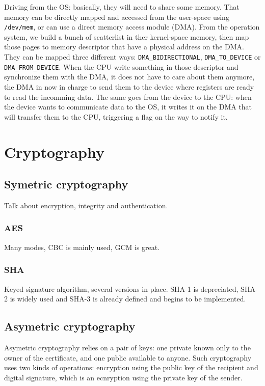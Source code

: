 Driving from the OS: basically, they will need to share some memory.
That memory can be directly mapped and accessed from the user-space using \texttt{/dev/mem}, or can use a direct memory access module (DMA).
From the operation system, we build a bunch of scatterlist in ther kernel-space memory, then map those pages to memory descriptor that have a physical address on the DMA.
They can be mapped three different ways: \texttt{DMA\_BIDIRECTIONAL}, \texttt{DMA\_TO\_DEVICE} or \texttt{DMA\_FROM\_DEVICE}.
When the CPU write something in those descriptor and synchronize them with the DMA, it does not have to care about them anymore, the DMA in now in charge to send them to the device where registers are ready to read the incomming data.
The same goes from the device to the CPU: when the device wants to communicate data to the OS, it writes it on the DMA that will transfer them to the CPU, triggering a flag on the way to notify it.

\section{Cryptography}

\subsection{Symetric cryptography}
Talk about encryption, integrity and authentication.


\subsubsection{AES}
Many modes, CBC is mainly used, GCM is great.

\subsubsection{SHA}
Keyed signature algorithm, several versions in place. SHA-1 is depreciated, SHA-2 is widely used and SHA-3 is already defined and begins to be implemented.

\subsection{Asymetric cryptography}
Asymetric cryptography relies on a pair of keys: one private known only to the owner of the certificate, and one public available to anyone.
Such cryptography uses two kinds of operations: encryption using the public key of the recipient and digital signature, which is an ecnryption using the private key of the sender.


